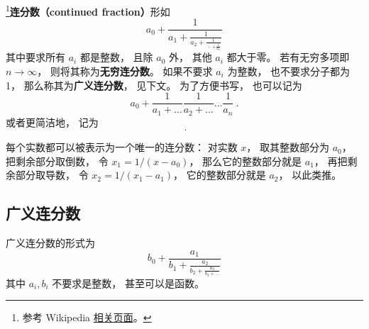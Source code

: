 
\footnote{参考 Wikipedia \href{https://en.wikipedia.org/wiki/Continued_fraction}{相关页面}。}\textbf{连分数（continued fraction）}形如
\begin{equation}
a_0 + \frac{1}{\displaystyle a_1 + \frac{1}{\displaystyle a_2 + \frac{1}{\displaystyle \ddots + \frac{1}{a_n}}}}
\end{equation}
其中要求所有 $a_i$ 都是整数， 且除 $a_0$ 外， 其他 $a_i$ 都大于零。 若有无穷多项即 $n\to\infty$， 则将其称为\textbf{无穷连分数}。 如果不要求 $a_i$ 为整数， 也不要求分子都为 1， 那么称其为\textbf{广义连分数}， 见下文。 为了方便书写， 也可以记为
\begin{equation}
a_0 + \frac{1}{a_1 + \dots}\frac{1}{a_2 + \dots}\dots \frac{1}{a_n}~.
\end{equation}
或者更简洁地， 记为
\begin{equation}
[a_0;\ a_1,\ a_2,\ \dots\ ,\ a_n]~.
\end{equation}

每个实数都可以被表示为一个唯一的连分数： 对实数 $x$， 取其整数部分为 $a_0$， 把剩余部分取倒数， 令 $x_1 = 1/(x-a_0)$， 那么它的整数部分就是 $a_1$， 再把剩余部分取导数， 令 $x_2 = 1/(x_1 - a_1)$， 它的整数部分就是 $a_2$， 以此类推。

\subsection{广义连分数}
广义连分数的形式为
\begin{equation}
b_0 + \frac{a_1}{\displaystyle b_1 + \frac{a_2}{\displaystyle b_2 + \frac{a_3}{\displaystyle b_3 + \dots}}}
\end{equation}
其中 $a_i, b_i$ 不要求是整数， 甚至可以是函数。
